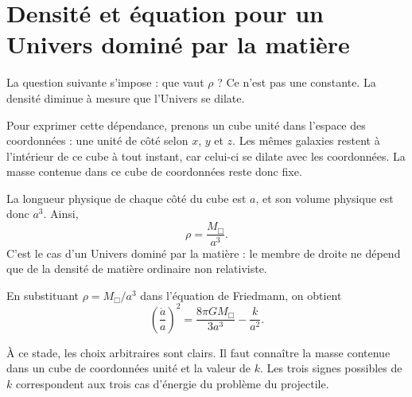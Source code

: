\section{Densité et équation pour un Univers dominé par la matière}

La question suivante s’impose : que vaut \(\rho\) ? Ce n’est pas une constante. La densité diminue à mesure que l’Univers se dilate.

Pour exprimer cette dépendance, prenons un cube unité dans l’espace des coordonnées : une unité de côté selon \(x\), \(y\) et \(z\). Les mêmes galaxies restent à l’intérieur de ce cube à tout instant, car celui-ci se dilate avec les coordonnées. La masse contenue dans ce cube de coordonnées reste donc fixe.


La longueur physique de chaque côté du cube est \(a\), et son volume physique est donc \(a^3\). Ainsi,
\begin{equation}
\rho=\frac{M_{\Box}}{a^3}.
\end{equation}
C’est le cas d’un Univers dominé par la matière : le membre de droite ne dépend que de la densité de matière ordinaire non relativiste.

\begin{classroomqa}
\end{classroomqa}

En substituant \(\rho=M_{\Box}/a^3\) dans l’équation de Friedmann, on obtient
\begin{equation}
\left(\frac{\dot a}{a}\right)^2=\frac{8\pi G M_{\Box}}{3a^3}-\frac{k}{a^2}.
\end{equation}

À ce stade, les choix arbitraires sont clairs. Il faut connaître la masse contenue dans un cube de coordonnées unité et la valeur de \(k\). Les trois signes possibles de \(k\) correspondent aux trois cas d’énergie du problème du projectile.

